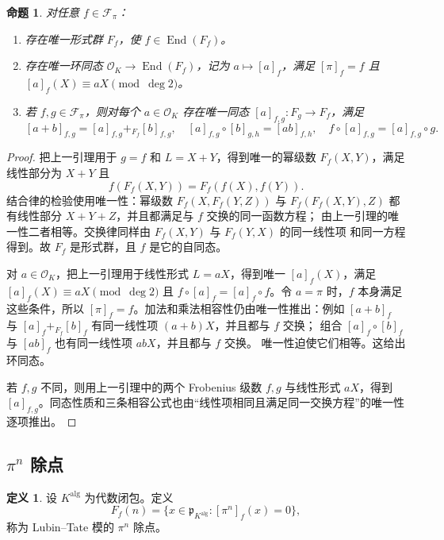 \documentclass[11pt,a4paper,openany]{ctexbook}
\numberwithin{equation}{chapter}
\theoremstyle{plain}
\newtheorem{proposition}[theorem]{命题}
\theoremstyle{definition}
\newtheorem{definition}[theorem]{定义}
\theoremstyle{remark}
\begin{document}
\begin{proposition}
对任意 $f\in\mathcal F_\pi$：
\begin{enumerate}[label=(\arabic*)]
\item 存在唯一形式群 $F_f$，使 $f\in\operatorname{End}(F_f)$。
\item 存在唯一环同态 $\mathcal O_K\to\operatorname{End}(F_f)$，记为 $a\mapsto[a]_f$，满足 $[\pi]_f=f$ 且 $[a]_f(X)\equiv aX\pmod{\deg2}$。
\item 若 $f,g\in\mathcal F_\pi$，则对每个 $a\in\mathcal O_K$ 存在唯一同态
$[a]_{f,g}:F_g\to F_f$，满足
\[
[a+b]_{f,g}=[a]_{f,g}+_{F_f}[b]_{f,g},\quad
[a]_{f,g}\circ[b]_{g,h}=[ab]_{f,h},\quad
f\circ[a]_{f,g}=[a]_{f,g}\circ g.
\]
\end{enumerate}
\end{proposition}

\begin{proof}
把上一引理用于 $g=f$ 和 $L=X+Y$，得到唯一的幂级数
$F_f(X,Y)$，满足线性部分为 $X+Y$ 且
\[
f(F_f(X,Y))=F_f(f(X),f(Y)).
\]
结合律的检验使用唯一性：幂级数 $F_f(X,F_f(Y,Z))$ 与
$F_f(F_f(X,Y),Z)$ 都有线性部分 $X+Y+Z$，并且都满足与 $f$ 交换的同一函数方程；
由上一引理的唯一性二者相等。交换律同样由 $F_f(X,Y)$ 与 $F_f(Y,X)$ 的同一线性项
和同一方程得到。故 $F_f$ 是形式群，且 $f$ 是它的自同态。

对 $a\in\mathcal O_K$，把上一引理用于线性形式 $L=aX$，得到唯一
$[a]_f(X)$，满足 $[a]_f(X)\equiv aX\pmod{\deg2}$ 且
$f\circ[a]_f=[a]_f\circ f$。令 $a=\pi$ 时，$f$ 本身满足这些条件，所以
$[\pi]_f=f$。加法和乘法相容性仍由唯一性推出：例如
$[a+b]_f$ 与 $[a]_f+_{F_f}[b]_f$ 有同一线性项 $(a+b)X$，并且都与 $f$ 交换；
组合 $[a]_f\circ[b]_f$ 与 $[ab]_f$ 也有同一线性项 $abX$，并且都与 $f$ 交换。
唯一性迫使它们相等。这给出环同态。

若 $f,g$ 不同，则用上一引理中的两个 Frobenius 级数 $f,g$ 与线性形式 $aX$，得到
$[a]_{f,g}$。同态性质和三条相容公式也由“线性项相同且满足同一交换方程”的唯一性
逐项推出。
\end{proof}

\subsection{\texorpdfstring{$\pi^n$}{pi n} 除点}

\begin{definition}
设 $K^{\mathrm{alg}}$ 为代数闭包。定义
\[
F_f(n)=\{x\in\mathfrak p_{K^{\mathrm{alg}}}: [\pi^n]_f(x)=0\},
\]
称为 Lubin--Tate 模的 $\pi^n$ 除点。
\end{definition}
\end{document}
